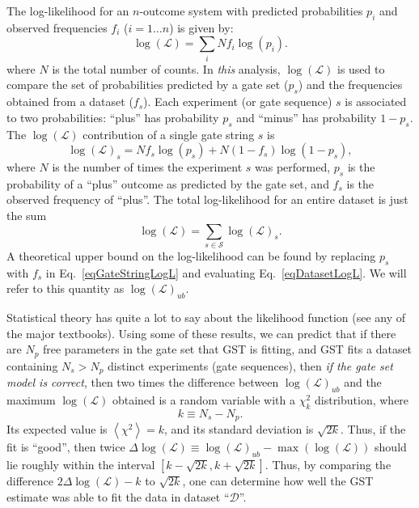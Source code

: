 \documentclass{article}[11pt]
\newcommand{\expec}[1]{\ensuremath{\left\langle#1\right\rangle}}
\begin{document}
The log-likelihood for an $n$-outcome system with predicted probabilities $p_i$ and observed frequencies $f_i$ ($i=1\ldots n$) is given by:
\begin{equation}
\log(\mathcal{L}) = \sum_i N f_i \log(p_i).
\end{equation}
where $N$ is the total number of counts. In \emph{this} analysis, $\log(\mathcal{L})$ is used to compare the set of probabilities predicted by a gate set ($p_s$) and the frequencies obtained from a dataset ($f_s$).  Each experiment (or gate sequence) $s$ is associated to two probabilities:  ``plus'' has probability $p_s$ and ``minus'' has probability $1-p_s$.  The $\log(\mathcal{L})$ contribution of a single gate string $s$ is
\begin{equation}
\log(\mathcal{L})_s = N f_s \log(p_s) + N (1-f_s) \log(1-p_s),\label{eqGateStringLogL}
\end{equation}
where $N$ is the number of times the experiment $s$ was performed, $p_s$ is the probability of a ``plus'' outcome as predicted by the gate set, and $f_s$ is the observed frequency of ``plus''.  The total log-likelihood for an entire dataset is just the sum 
\begin{equation}
\log(\mathcal{L}) = \sum_{s\in\mathcal{S}}{ \log(\mathcal{L})_s}.\label{eqDatasetLogL}
\end{equation}
A theoretical upper bound on the log-likelihood can be found by replacing $p_s$ with $f_s$ in Eq.~\ref{eqGateStringLogL} and evaluating Eq.~\ref{eqDatasetLogL}.  We will refer to this quantity as $\log(\mathcal{L})_{ub}$.

Statistical theory has quite a lot to say about the likelihood function (see any of the major textbooks).  Using some of these results, we can predict that if there are $N_p$ free parameters in the gate set that GST is fitting, and GST fits a dataset containing $N_s > N_p$ distinct experiments (gate sequences), then \emph{if the gate set model is correct}, then two times the difference between $\log(\mathcal{L})_{ub}$ and the maximum $\log(\mathcal{L})$ obtained is a random variable with a $\chi^2_{k}$ distribution, where 
$$k \equiv N_s - N_p.$$
Its expected value is $\expec{\chi^2}=k$, and its standard deviation is $\sqrt{2k}$.  Thus, if the fit is ``good'', then twice $\Delta\log(\mathcal{L}) \equiv \log(\mathcal{L})_{ub} - \max(\log(\mathcal{L}))$ should lie roughly within the interval $[k-\sqrt{2k},k+\sqrt{2k}]$.
Thus, by comparing the difference $2\Delta\log(\mathcal{L}) - k$ to $\sqrt{2k}$, one can determine how well the GST estimate was able to fit the data in dataset ``$\mathcal{D}$''.
\end{document}
